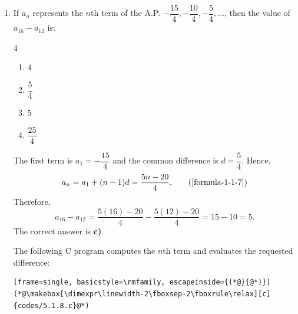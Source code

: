 \begin{enumerate}[label={},font=\normalfont,leftmargin=1.15cm,labelwidth=1.0cm,labelsep=0.15cm,itemindent=0pt,listparindent=0pt,parsep=0pt,topsep=0pt]
\item[5.1.8] If $a_n$ represents the $n$th term of the A.P. $-\dfrac{15}{4},-\dfrac{10}{4},-\dfrac{5}{4},\ldots$, then the value of $a_{16}-a_{12}$ is:

\begin{multicols}{4}
\begin{enumerate}
\setlength{\itemsep}{0pt}
    \item $4$
    \item $\dfrac{5}{4}$
    \item $5$
    \item $\dfrac{25}{4}$
\end{enumerate}
\end{multicols}

\vspace{0.7em}\par\solution


The first term is $a_1=-\dfrac{15}{4}$ and the common difference is $d=\dfrac{5}{4}$. Hence,
\begin{equation*}
a_n=a_1+(n-1)d=\frac{5n-20}{4}.
\tag*{(\ref{formula-1-1-7})}\end{equation*}
Therefore,
\[
a_{16}-a_{12}=\frac{5(16)-20}{4}-\frac{5(12)-20}{4}=15-10=5.
\]
The correct answer is \textbf{c)}.

The following C program computes the $n$th term and evaluates the requested difference:
\begin{lstlisting}[frame=single, basicstyle=\rmfamily, escapeinside={(*@}{@*)}]
(*@\makebox[\dimexpr\linewidth-2\fboxsep-2\fboxrule\relax][c]{codes/5.1.8.c}@*)
\end{lstlisting}

\end{enumerate}
\vspace{1.2em}
